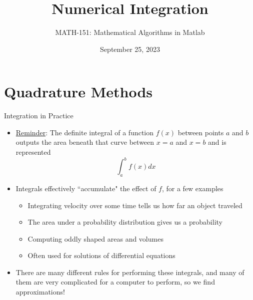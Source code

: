 {}\documentclass[letterpaper,
compress,
xcolor=x11names,
]{beamer}
\begin{document}
	\title{Numerical Integration}
	\author{MATH-151:  Mathematical Algorithms in Matlab}
	\date[202X]{September 25, 2023}




\begin{frame}
\titlepage
\end{frame}
\section{Quadrature Methods}

\begin{frame}{Integration in Practice}
	\footnotesize
	\begin{itemize}
		\item \underline{Reminder}: The definite integral of a function $f(x)$ between points $a$ and $b$ outputs the area beneath that curve between $x=a$ and $x=b$ and is represented 
		\begin{equation*}
			\int_{a}^{b}f(x)dx
		\end{equation*}
		\begin{center}
		\end{center}
		\item<2-> Integrals effectively ``accumulate" the effect of $f$, for a few examples
		\begin{itemize}
			\item Integrating velocity over some time tells us how far an object traveled
			\item The area under a probability distribution gives us a probability
			\item Computing oddly shaped areas and volumes
			\item Often used for solutions of differential equations
		\end{itemize}
		\item<3-> There are many different rules for performing these integrals, and many of them are very complicated for a computer to perform, so we find approximations!
	\end{itemize}
\end{frame}
\end{document}
